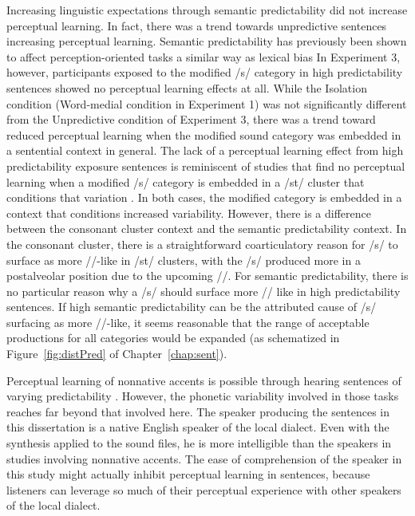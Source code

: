Increasing linguistic expectations through semantic predictability did not increase perceptual learning.
In fact, there was a trend towards unpredictive sentences increasing perceptual learning.
Semantic predictability has previously been shown to affect perception-oriented tasks a similar way as lexical bias \citep{Connine1987,Borsky1998}
In Experiment 3, however, participants exposed to the modified /s/ category in high predictability sentences showed no perceptual learning effects at all.
While the Isolation condition (Word-medial condition in Experiment 1) was not significantly different from the Unpredictive condition of Experiment 3, there was a trend toward reduced perceptual learning when the modified sound category was embedded in a sentential context in general.
The lack of a perceptual learning effect from high predictability exposure sentences is reminiscent of studies that find no perceptual learning when a modified /s/ category is embedded in a /st\textturnr/ cluster that conditions that variation \citep{Kraljic2008a}.
In both cases, the modified category is embedded in a context that conditions increased variability.
However, there is a difference between the consonant cluster context and the semantic predictability context.
In the consonant cluster, there is a straightforward coarticulatory reason for /s/ to surface as more /\textesh/-like in /st\textturnr/ clusters, with the /s/ produced more in a postalveolar position due to the upcoming /\textturnr/.
For semantic predictability, there is no particular reason why a /s/ should surface more /\textesh/ like in high predictability sentences.
If high semantic predictability can be the attributed cause of /s/ surfacing as more /\textesh/-like, it seems reasonable that the range of acceptable productions for all categories would be expanded (as schematized in Figure~\ref{fig:distPred} of Chapter~\ref{chap:sent}).

Perceptual learning of nonnative accents is possible through hearing sentences of varying predictability \citep[and others]{Bradlow2008}.
However, the phonetic variability involved in those tasks reaches far beyond that involved here.  
The speaker producing the sentences in this dissertation is a native English speaker of the local dialect.
Even with the synthesis applied to the sound files, he is more intelligible than the speakers in studies involving nonnative accents.
The ease of comprehension of the speaker in this study might actually inhibit perceptual learning in sentences, because listeners can leverage so much of their perceptual experience with other speakers of the local dialect.

